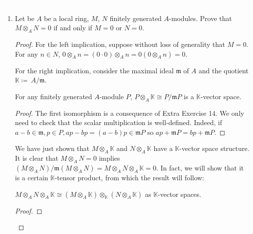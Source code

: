 \begin{problem}\textcolor{white}{.}

    \begin{enumerate}[label=(\theproblem.\arabic*),ref=\theproblem.\arabic*]
        \item Let be $A$ be a local ring, $M$, $N$ finitely generated $A$-modules.
        Prove that $M \otimes_A N = 0$ if and only if $M = 0$ or $N = 0$.
            \begin{sol}
                \begin{proof}
                    For the left implication, suppose without loss of generality that $M = 0$.
                    For any $n \in N$, $0 \otimes_A n = (0\cdot0) \otimes_A n = 0(0 \otimes_A n) = 0$.

                    For the right implication, consider the maximal ideal $\mathfrak{m}$ of $A$
                    and the quotient $\mathbb{K}\coloneqq~A/\mathfrak{m}$.
                    \begin{claim}
                        For any finitely generated $A$-module $P$, 
                        $P \otimes_A \mathbb{K} \cong P/\mathfrak{m}P$ is a $\mathbb{K}$-vector space.
                        \begin{proof}
                            The first isomorphism is a consequence of Extra Exercise 14.
                            We only need to check that the scalar multiplication is well-defined.
                            Indeed, if $a - b \in \mathfrak{m}, p \in P, ap - bp = (a-b) p \in \mathfrak{m}P$
                            so $ap + \mathfrak{m}P = bp + \mathfrak{m}P$.
                        \end{proof}
                    \end{claim}

                    We have just shown that $M \otimes_A \mathbb{K}$ and $N \otimes_A \mathbb{K}$ have a $\mathbb{K}$-vector space structure.
                    It is clear that $M \otimes_A N = 0$ implies $(M \otimes_A N) / \mathfrak{m}(M \otimes_A N) = M \otimes_A  N \otimes_A \mathbb{K} = 0$.
                    In fact, we will show that it is a certain $\mathbb{K}$-tensor product, from which the result will follow:

                    \begin{claim}
                        $M \otimes_A N \otimes_A \mathbb{K} \cong (M \otimes_A \mathbb{K}) \otimes_{\mathbb{K}} (N \otimes_A \mathbb{K})$ as $\mathbb{K}$-vector spaces.
                            \begin{proof}


\end{proof}
\end{claim}
\end{proof}
\end{sol}
\end{enumerate}
\end{problem}
